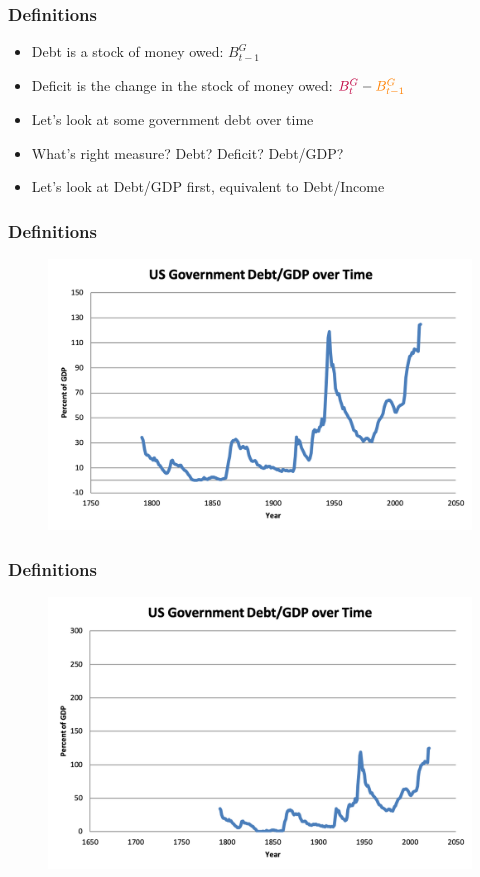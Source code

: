 \documentclass{beamer}
\begin{document}
\begin{frame}
\frametitle{Definitions}
\begin{itemize}
\item Debt is a stock of money owed:  $B_{t-1}^G$
\bigskip
\item Deficit is the change in the stock of money owed: $\textcolor{purple}{B_t^G}-\textcolor{orange}{B_{t-1}^G}$
\bigskip
\item Let's look at some government debt over time
\bigskip
\item What's right measure?  Debt?  Deficit?  Debt/GDP?
\bigskip
\item Let's look at Debt/GDP first, equivalent to Debt/Income
\end{itemize}
\end{frame}

\begin{frame}
\frametitle{Definitions}
\begin{figure}
\centering
\includegraphics[scale=0.6]{Debt0.png}
\end{figure}
\end{frame}

\begin{frame}
\frametitle{Definitions}
\begin{figure}
\centering
\includegraphics[scale=0.6]{Debt1.png}
\end{figure}
\end{frame}
\end{document}
